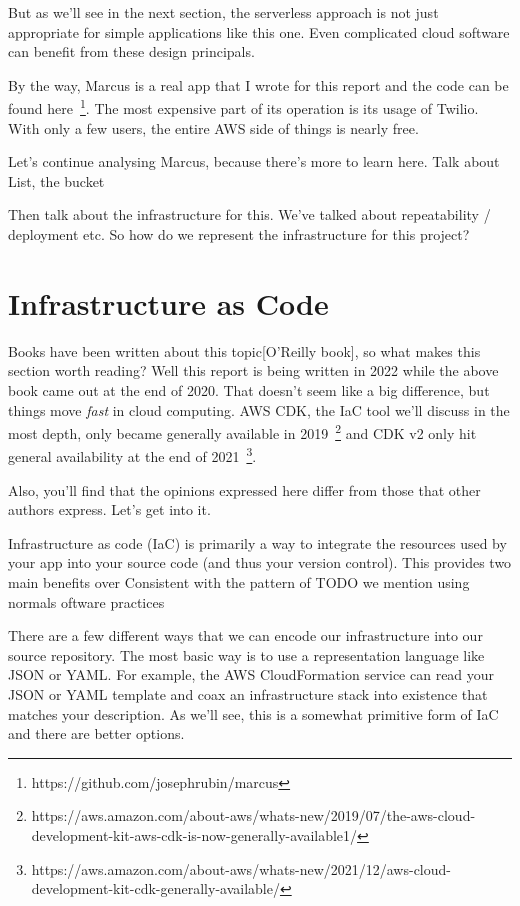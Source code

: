 \documentclass{article}
\begin{document}
But as we'll see in the next section, the serverless approach is not just appropriate for simple applications like this one.
Even complicated cloud software can benefit from these design principals.

By the way, Marcus is a real app that I wrote for this report and the code can be found here~\footnote{https://github.com/josephrubin/marcus}.
The most expensive part of its operation is its usage of Twilio.
With only a few users, the entire AWS side of things is nearly free.

Let's continue analysing Marcus, because there's more to learn here.
Talk about List, the bucket

Then talk about the infrastructure for this.
We've talked about repeatability / deployment etc.
So how do we represent the infrastructure for this project?

\section{Infrastructure as Code}

Books have been written about this topic[O'Reilly book], so what makes this section worth reading?
Well this report is being written in 2022 while the above book came out at the end of 2020.
That doesn't seem like a big difference, but things move \textit{fast} in cloud computing.
AWS CDK, the IaC tool we'll discuss in the most depth, only became generally available in 2019~\footnote{https://aws.amazon.com/about-aws/whats-new/2019/07/the-aws-cloud-development-kit-aws-cdk-is-now-generally-available1/} and CDK v2 only hit general availability at the end of 2021~\footnote{https://aws.amazon.com/about-aws/whats-new/2021/12/aws-cloud-development-kit-cdk-generally-available/}.

Also, you'll find that the opinions expressed here differ from those that other authors express. Let's get into it.

Infrastructure as code (IaC) is primarily a way to integrate the resources used by your app into your source code (and thus your version control).
This provides two main benefits over 
Consistent with the pattern of TODO we 
mention using normals oftware practices

There are a few different ways that we can encode our infrastructure into our source repository.
The most basic way is to use a representation language like JSON or YAML.
For example, the AWS CloudFormation service can read your JSON or YAML template and coax an infrastructure stack into existence that matches your description.
As we'll see, this is a somewhat primitive form of IaC and there are better options.
\end{document}
